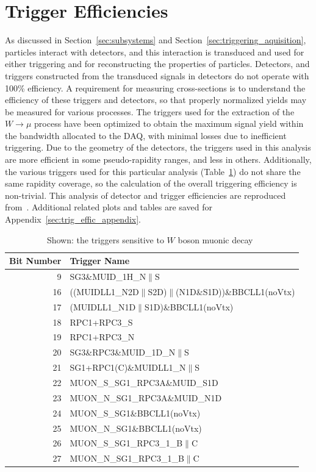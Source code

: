 \clearpage
\section{Trigger Efficiencies}

As discussed in Section~\ref{sec:subsystems} and
Section~\ref{sec:triggering_aquisition}, particles interact with detectors, and
this interaction is transduced and used for either triggering and for
reconstructing the properties of particles. Detectors, and triggers constructed
from the transduced signals in detectors do not operate with 100\% efficiency.
A requirement for measuring cross-sections is to understand the efficiency of
these triggers and detectors, so that properly normalized yields may be measured
for various processes. The triggers used for the extraction of the
$W\rightarrow\mu$ process have been optimized to obtain the maximum signal yield
within the bandwidth allocated to the DAQ, with minimal losses due to
inefficient triggering. Due to the geometry of the detectors, the triggers used
in this analysis are more efficient in some pseudo-rapidity ranges, and less in
others. Additionally, the various triggers used for this particular analysis
(Table~\ref{tab:w_triggers}) do not share the same rapidity coverage, so the
calculation of the overall triggering efficiency is non-trivial. This analysis
of detector and trigger efficiencies are reproduced from~\cite{Seidl2014}.
Additional related plots and tables are saved for
Appendix~\ref{sec:trig_effic_appendix}.

\begin{table}[ht]
  \centering
  \begin{tabular}{r l}
    \toprule
    \textbf{Bit Number} & \textbf{Trigger Name} \\ 
    \midrule
    9 & SG3\&MUID\_1H\_N$\|$S\\
    16 & ((MUIDLL1\_N2D$\|$S2D)$\|$(N1D\&S1D))\&BBCLL1(noVtx)\\
    17 & (MUIDLL1\_N1D$\|$S1D)\&BBCLL1(noVtx)\\
    18 & RPC1+RPC3\_S\\
    19 & RPC1+RPC3\_N\\
    20 & SG3\&RPC3\&MUID\_1D\_N$\|$S\\
    21 & SG1+RPC1(C)\&MUIDLL1\_N$\|$S\\
    22 & MUON\_S\_SG1\_RPC3A\&MUID\_S1D\\
    23 & MUON\_N\_SG1\_RPC3A\&MUID\_N1D\\
    24 & MUON\_S\_SG1\&BBCLL1(noVtx)\\
    25 & MUON\_N\_SG1\&BBCLL1(noVtx)\\
    26 & MUON\_S\_SG1\_RPC3\_1\_B$\|$C\\
    27 & MUON\_N\_SG1\_RPC3\_1\_B$\|$C\\ 
    \bottomrule
  \end{tabular}
  \caption{Shown: the triggers sensitive to $W$ boson muonic
  decay~\cite{Seidl2014} }
  \label{tab:w_triggers}
\end{table}
\clearpage

